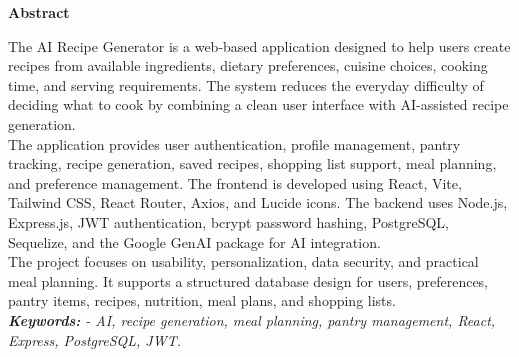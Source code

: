 \begin{center}
\thispagestyle{plain}
\vspace{2cm}
\LARGE{\textbf{Abstract}}\\[1.0cm]
\end{center}
The AI Recipe Generator is a web-based application designed to help users create
recipes from available ingredients, dietary preferences, cuisine choices, cooking
time, and serving requirements. The system reduces the everyday difficulty of deciding
what to cook by combining a clean user interface with AI-assisted recipe generation.\\
The application provides user authentication, profile management, pantry tracking,
recipe generation, saved recipes, shopping list support, meal planning, and preference
management. The frontend is developed using React, Vite, Tailwind CSS, React Router,
Axios, and Lucide icons. The backend uses Node.js, Express.js, JWT authentication,
bcrypt password hashing, PostgreSQL, Sequelize, and the Google GenAI package for AI
integration.\\
The project focuses on usability, personalization, data security, and practical meal
planning. It supports a structured database design for users, preferences, pantry
items, recipes, nutrition, meal plans, and shopping lists. \newline\\
 

\textit{{\textbf{Keywords: }}- AI, recipe generation, meal planning, pantry management, React, Express,
PostgreSQL, JWT.}
